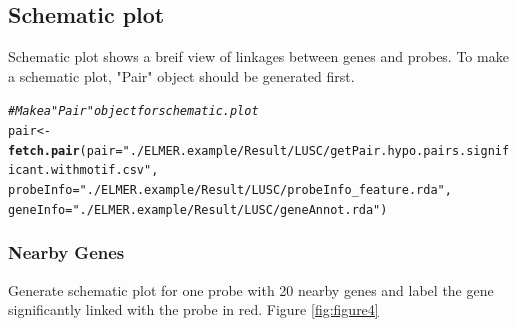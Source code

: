 \documentclass{article}\usepackage[]{graphicx}\usepackage[]{color}
\makeatletter
\newcommand{\hlstr}[1]{\textcolor[rgb]{0.192,0.494,0.8}{#1}}%
\newcommand{\hlcom}[1]{\textcolor[rgb]{0.678,0.584,0.686}{\textit{#1}}}%
\newcommand{\hlstd}[1]{\textcolor[rgb]{0.345,0.345,0.345}{#1}}%
\newcommand{\hlkwb}[1]{\textcolor[rgb]{0.69,0.353,0.396}{#1}}%
\newcommand{\hlkwc}[1]{\textcolor[rgb]{0.333,0.667,0.333}{#1}}%
\newcommand{\hlkwd}[1]{\textcolor[rgb]{0.737,0.353,0.396}{\textbf{#1}}}%
\newenvironment{kframe}{%
 \def\at@end@of@kframe{}%
 \ifinner\ifhmode%
  \def\at@end@of@kframe{\end{minipage}}%
  \begin{minipage}{\columnwidth}%
 \fi\fi%
 \def\FrameCommand##1{\hskip\@totalleftmargin \hskip-\fboxsep
 \colorbox{shadecolor}{##1}\hskip-\fboxsep
     \hskip-\linewidth \hskip-\@totalleftmargin \hskip\columnwidth}%
 \MakeFramed {\advance\hsize-\width
   \@totalleftmargin\z@ \linewidth\hsize
   \@setminipage}}%
 {\par\unskip\endMakeFramed%
 \at@end@of@kframe}
\newenvironment{knitrout}{}{} %
\makeatother
\begin{document}
\subsection{Schematic plot}
Schematic plot shows a breif view of linkages between genes and probes. To make a 
schematic plot, "Pair" object should be generated first.
\begin{knitrout}
\color{fgcolor}\begin{kframe}
\begin{alltt}
\hlcom{# Make a "Pair" object for schematic.plot}
\hlstd{pair} \hlkwb{<-} \hlkwd{fetch.pair}\hlstd{(}\hlkwc{pair}\hlstd{=}\hlstr{"./ELMER.example/Result/LUSC/getPair.hypo.pairs.significant.withmotif.csv"}\hlstd{,}
                   \hlkwc{probeInfo} \hlstd{=} \hlstr{"./ELMER.example/Result/LUSC/probeInfo_feature.rda"}\hlstd{,}
                   \hlkwc{geneInfo} \hlstd{=} \hlstr{"./ELMER.example/Result/LUSC/geneAnnot.rda"}\hlstd{)}
\end{alltt}


{\ttfamily\noindent\itshape{}}\end{kframe}
\end{knitrout}

\subsubsection{Nearby Genes}
Generate schematic plot for one probe with 20 nearby genes and label 
the gene significantly linked with the probe in red. Figure \ref{fig:figure4}
\end{document}
